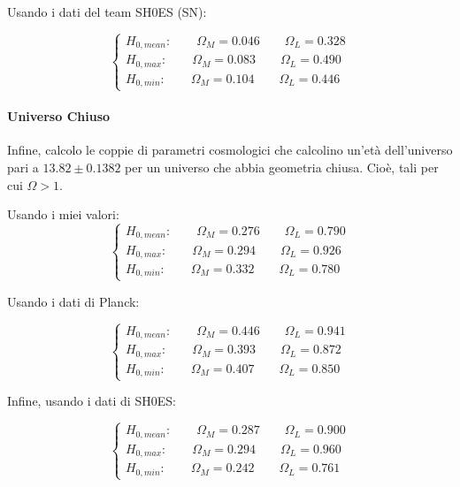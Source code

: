 \documentclass{article}
\begin{document}
Usando i dati del team SH0ES (SN):

\begin{equation}
  \begin{cases}
    H_{0,mean} : \qquad \Omega_M = 0.046 \qquad \Omega_L = 0.328 \\
    H_{0,max} : \qquad \Omega_M = 0.083 \qquad \Omega_L = 0.490 \\
    H_{0,min} : \qquad \Omega_M = 0.104 \qquad \Omega_L = 0.446
  \end{cases}
\end{equation}

\paragraph{Universo Chiuso}

Infine, calcolo le coppie di parametri cosmologici che calcolino
un'età dell'universo pari a $13.82\pm0.1382$ per un universo che abbia
geometria chiusa. Cioè, tali per cui $\Omega > 1$.

Usando i miei valori:
\begin{equation}
  \begin{cases}
    H_{0,mean} : \qquad \Omega_M = 0.276 \qquad \Omega_L = 0.790 \\
    H_{0,max} : \qquad \Omega_M = 0.294 \qquad \Omega_L = 0.926 \\
    H_{0,min} : \qquad \Omega_M = 0.332 \qquad \Omega_L = 0.780
  \end{cases}
\end{equation}

Usando i dati di Planck:

\begin{equation}
  \begin{cases}
    H_{0,mean} : \qquad \Omega_M = 0.446 \qquad \Omega_L = 0.941 \\
    H_{0,max} : \qquad \Omega_M = 0.393 \qquad \Omega_L = 0.872 \\
    H_{0,min} : \qquad \Omega_M = 0.407 \qquad \Omega_L = 0.850
  \end{cases}
\end{equation}

Infine, usando i dati di SH0ES:

\begin{equation}
  \begin{cases}
    H_{0,mean} : \qquad \Omega_M = 0.287 \qquad \Omega_L = 0.900 \\
    H_{0,max} : \qquad \Omega_M = 0.294 \qquad \Omega_L = 0.960 \\
    H_{0,min} : \qquad \Omega_M = 0.242 \qquad \Omega_L = 0.761
  \end{cases}
\end{equation}
\end{document}
